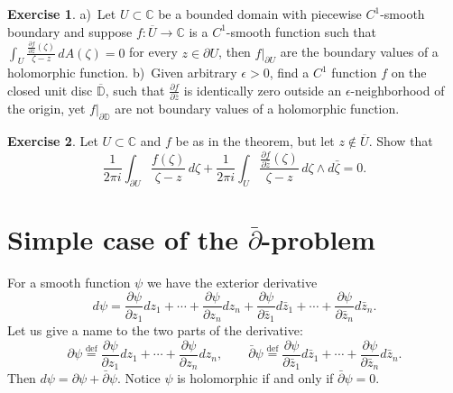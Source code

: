 \documentclass[12pt,openany]{book}
\newcommand{\C}{{\mathbb{C}}}
\newcommand{\D}{{\mathbb{D}}}
\theoremstyle{plain}
\theoremstyle{remark}
\theoremstyle{definition}
\newenvironment{exbox}{%
    \def\FrameCommand{\vrule width 1pt \relax\hspace {10pt}}%
    \MakeFramed {\advance \hsize -\width \FrameRestore }%
}{%
    \endMakeFramed
}
\theoremstyle{exercise}
\newtheorem{exercise}{Exercise}[section]
\theoremstyle{example}
\begin{document}
\begin{exbox}
\begin{exercise}
a)~Let $U \subset \C$ be a bounded domain with piecewise $C^1$-smooth boundary and
suppose $f \colon \overline{U} \to \C$ is a $C^1$-smooth function such
that 
$\int_{U} \frac{\frac{\partial f}{\partial \bar{z}}(\zeta)}{\zeta-z} \,
dA(\zeta) =
0$ for every $z \in \partial U$, then $f|_{\partial U}$ are the boundary
values of a holomorphic function.
b)~Given arbitrary $\epsilon > 0$, find a $C^1$ function $f$ on the closed unit disc
$\overline{\D}$,
such that $\frac{\partial f}{\partial \bar{z}}$ is identically zero
outside an $\epsilon$-neighborhood of the origin, yet $f|_{\partial \D}$
are not boundary values of a holomorphic function.
\end{exercise}

\begin{exercise}
Let $U \subset \C$ and $f$ be as in the theorem, but let $z \notin
\overline{U}$.  Show that
\begin{equation*}
\frac{1}{2\pi i}
\int_{\partial U}
\frac{f(\zeta)}{\zeta-z}
\,
d \zeta
+
\frac{1}{2\pi i}
\int_{U}
\frac{\frac{\partial f}{\partial \bar{z}}(\zeta)}{\zeta-z}
\,
d\zeta \wedge d\bar{\zeta} 
= 0 .
\end{equation*}
\end{exercise}
\end{exbox}


\section{Simple case of the \texorpdfstring{$\bar{\partial}$}{dbar}-problem}

For a smooth function $\psi$ we have the exterior derivative
\begin{equation*}
d \psi =
\frac{\partial \psi}{\partial z_1} dz_1 + \cdots +
\frac{\partial \psi}{\partial z_n} dz_n
+
\frac{\partial \psi}{\partial \bar{z}_1} d\bar{z}_1 + \cdots +
\frac{\partial \psi}{\partial \bar{z}_n} d\bar{z}_n .
\end{equation*}
Let us give a name to the two parts of the derivative:
\begin{equation*}
\partial \psi \overset{\text{def}}{=}
\frac{\partial \psi}{\partial z_1} dz_1 + \cdots +
\frac{\partial \psi}{\partial z_n} dz_n, \qquad
\bar{\partial} \psi \overset{\text{def}}{=}
\frac{\partial \psi}{\partial \bar{z}_1} d\bar{z}_1 + \cdots +
\frac{\partial \psi}{\partial \bar{z}_n} d\bar{z}_n .
\end{equation*}
Then $d \psi = \partial \psi + \bar{\partial} \psi$.
Notice $\psi$ is holomorphic if and only if $\bar{\partial} \psi = 0$.
\end{document}
